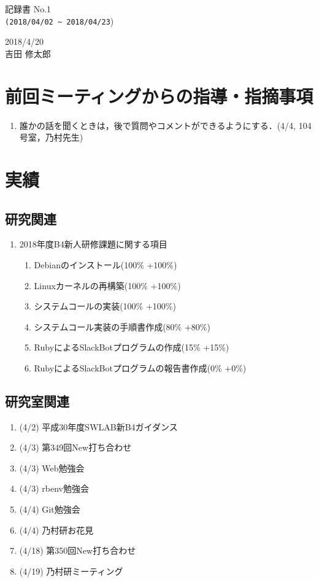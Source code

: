 \documentclass[12pt]{jsarticle}
\begin{document}
\begin{center}
  {\LARGE 記録書 No.1}\\
  {\verb|(2018/04/02 ~ 2018/04/23|)}
\end{center}

\begin{flushright}
  2018/4/20\\
  吉田 修太郎 
\end{flushright}
\section{前回ミーティングからの指導・指摘事項}
\label{sec:introduction}
\begin{enumerate}
\item 誰かの話を聞くときは，後で質問やコメントができるようにする．(4/4, 104号室，乃村先生)
\end{enumerate}

\section{実績}\label{jisseki}
\subsection{研究関連}\label{kenkyuu}
\begin{enumerate}
\item 2018年度B4新人研修課題に関する項目
  \begin{enumerate}
  \item Debianのインストール(100\% +100\%)
  \item Linuxカーネルの再構築(100\% +100\%)
  \item システムコールの実装(100\% +100\%)
  \item システムコール実装の手順書作成(80\% +80\%)
  \item RubyによるSlackBotプログラムの作成(15\% +15\%)
  \item RubyによるSlackBotプログラムの報告書作成(0\% +0\%)
  \end{enumerate}
\end{enumerate}
\subsection{研究室関連}\label{kenkyuushitu}
\begin{enumerate}
\item (4/2) 平成30年度SWLAB新B4ガイダンス
\item (4/3) 第349回New打ち合わせ
\item (4/3) Web勉強会
\item (4/3) rbenv勉強会
\item (4/4) Git勉強会
\item (4/4) 乃村研お花見
\item (4/18) 第350回New打ち合わせ
\item (4/19) 乃村研ミーティング
\end{enumerate}
\end{document}
